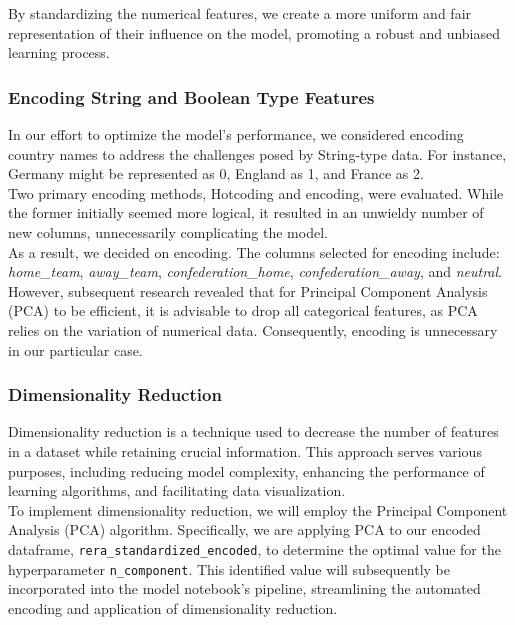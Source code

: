 \documentclass[a4paper,12pt]{article}
\begin{document}
By standardizing the numerical features, we create a more uniform and fair representation of their influence on the model, promoting a robust and unbiased learning process.

\subsubsection{Encoding String and Boolean Type Features}

In our effort to optimize the model's performance, we considered encoding country names to address the challenges posed by String-type data. For instance, Germany might be represented as 0, England as 1, and France as 2.\\

Two primary encoding methods, Hotcoding and encoding, were evaluated. While the former initially seemed more logical, it resulted in an unwieldy number of new columns, unnecessarily complicating the model.\\

As a result, we decided on encoding. The columns selected for encoding include: \textit{home\_team}, \textit{away\_team}, \textit{confederation\_home}, \textit{confederation\_away}, and \textit{neutral}.\\

However, subsequent research revealed that for Principal Component Analysis (PCA) to be efficient, it is advisable to drop all categorical features, as PCA relies on the variation of numerical data. Consequently, encoding is unnecessary in our particular case.


\subsubsection{Dimensionality Reduction}

Dimensionality reduction is a technique used to decrease the number of features in a dataset while retaining crucial information. This approach serves various purposes, including reducing model complexity, enhancing the performance of learning algorithms, and facilitating data visualization.\\

To implement dimensionality reduction, we will employ the Principal Component Analysis (PCA) algorithm. Specifically, we are applying PCA to our encoded dataframe, \texttt{rera\_standardized\_encoded}, to determine the optimal value for the hyperparameter \texttt{n\_component}. This identified value will subsequently be incorporated into the model notebook's pipeline, streamlining the automated encoding and application of dimensionality reduction.\\
\end{document}
